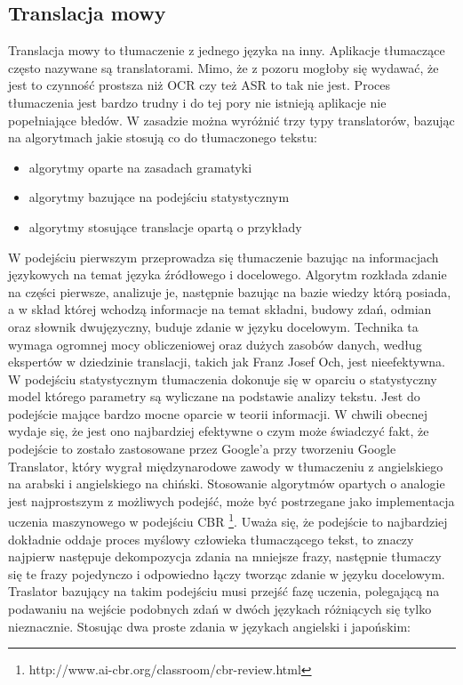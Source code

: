 \subsection{Translacja mowy}
Translacja mowy to tłumaczenie z jednego języka na inny. Aplikacje tłumaczące często nazywane są translatorami. Mimo, że z pozoru mogłoby się wydawać, że jest to czynność prostsza niż OCR czy też ASR to tak nie jest. Proces tłumaczenia jest bardzo trudny i do tej pory nie istnieją aplikacje nie popełniające błedów. W zasadzie można wyróżnić trzy typy translatorów, bazując na algorytmach jakie stosują co do tłumaczonego tekstu:
\begin{itemize}
	\item algorytmy oparte na zasadach gramatyki
	\item algorytmy bazujące na podejściu statystycznym
	\item algorytmy stosujące translacje opartą o przykłady
\end{itemize}
W podejściu pierwszym przeprowadza się tłumaczenie bazując na informacjach językowych na temat języka źródłowego i docelowego. Algorytm rozkłada zdanie na części pierwsze, analizuje je, następnie bazując na bazie wiedzy którą posiada, a w skład której wchodzą informacje na temat składni, budowy zdań, odmian oraz słownik dwujęzyczny, buduje zdanie w języku docelowym. Technika ta wymaga ogromnej mocy obliczeniowej oraz dużych zasobów danych, według ekspertów w dziedzinie translacji, takich jak Franz Josef Och, jest nieefektywna.
W podejściu statystycznym tłumaczenia dokonuje się w oparciu o statystyczny model którego parametry są wyliczane na podstawie analizy tekstu. Jest do podejście mające bardzo mocne oparcie w teorii informacji. W chwili obecnej wydaje się, że jest ono najbardziej efektywne o czym może świadczyć fakt, że podejście to zostało zastosowane przez Google'a przy tworzeniu Google Translator, który wygrał międzynarodowe zawody w tłumaczeniu z angielskiego na arabski i angielskiego na chiński.
Stosowanie algorytmów opartych o analogie jest najprostszym z możliwych podejść, może być postrzegane jako implementacja uczenia maszynowego w podejściu CBR \footnote{http://www.ai-cbr.org/classroom/cbr-review.html}. Uważa się, że podejście to najbardziej dokładnie oddaje proces myślowy człowieka tłumaczącego tekst, to znaczy najpierw następuje dekompozycja zdania na mniejsze frazy, następnie tłumaczy się te frazy pojedynczo i odpowiedno łączy tworząc zdanie w języku docelowym. Traslator bazujący na takim podejściu musi przejść fazę uczenia, polegającą na podawaniu na wejście podobnych zdań w dwóch językach różniących się tylko nieznacznie. Stosując dwa proste zdania w językach angielski i japońskim: 
